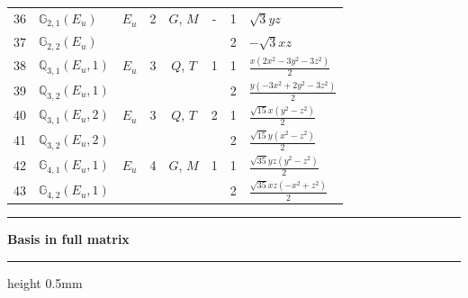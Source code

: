 \documentclass[fleqn,10pt,landscape]{jsarticle}
\begin{document}
\begin{longtable}[l]{clcccccl}
36 & $\mathbb{G}_{2,1}(E_{u})$ & $E_{u}$ & 2 & $G$, $M$ & - & 1 & $\sqrt{3} y z$ \\
37 & $\mathbb{G}_{2,2}(E_{u})$ &  &  &  &  & 2 & $- \sqrt{3} x z$ \\ \hline
38 & $\mathbb{Q}_{3,1}(E_{u},1)$ & $E_{u}$ & 3 & $Q$, $T$ & 1 & 1 & $\frac{x \left(2 x^{2} - 3 y^{2} - 3 z^{2}\right)}{2}$ \\
39 & $\mathbb{Q}_{3,2}(E_{u},1)$ &  &  &  &  & 2 & $\frac{y \left(- 3 x^{2} + 2 y^{2} - 3 z^{2}\right)}{2}$ \\ \hline
40 & $\mathbb{Q}_{3,1}(E_{u},2)$ & $E_{u}$ & 3 & $Q$, $T$ & 2 & 1 & $\frac{\sqrt{15} x \left(y^{2} - z^{2}\right)}{2}$ \\
41 & $\mathbb{Q}_{3,2}(E_{u},2)$ &  &  &  &  & 2 & $\frac{\sqrt{15} y \left(x^{2} - z^{2}\right)}{2}$ \\ \hline
42 & $\mathbb{G}_{4,1}(E_{u},1)$ & $E_{u}$ & 4 & $G$, $M$ & 1 & 1 & $\frac{\sqrt{35} y z \left(y^{2} - z^{2}\right)}{2}$ \\
43 & $\mathbb{G}_{4,2}(E_{u},1)$ &  &  &  &  & 2 & $\frac{\sqrt{35} x z \left(- x^{2} + z^{2}\right)}{2}$ \\
\end{longtable}
\vspace{5mm}
\noindent \rule[0.5mm]{5mm}{0.5mm}\hspace{3mm}\textbf{Basis in full matrix}\hspace{3mm}\leaders\hrule height 0.5mm\hfill\kern0pt
\vspace{3mm}
\end{document}
